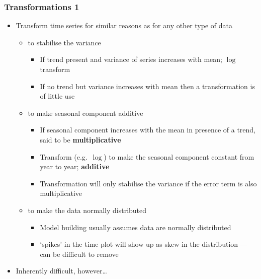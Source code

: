\documentclass{beamer}
\begin{document}
\begin{frame}
\frametitle{Transformations 1}
    \begin{itemize}
        \item Transform time series for similar reasons as for any other type of data
        \begin{itemize}
            \item to stabilise the variance
            \begin{itemize}
                \item If trend present and variance of series increases with mean; $\log$ transform
                \item If no trend but variance increases with mean then a transformation is of little use
            \end{itemize}
            \item to make seasonal component additive
            \begin{itemize}
                \item If seasonal component increases with the mean in presence of a trend, said to be \textbf{multiplicative}
                \item Transform (e.g.~$\log$) to make the seasonal component constant from year to year; \textbf{additive}
                \item Transformation will only stabilise the variance if the error term is also multiplicative
            \end{itemize}
            \item to make the data normally distributed
            \begin{itemize}
                \item Model building usually assumes data are normally distributed
                \item `spikes' in the time plot will show up as skew in the distribution --- can be difficult to remove
            \end{itemize}
        \end{itemize}
        \item Inherently difficult, however\ldots
    \end{itemize}
\end{frame}
\end{document}

